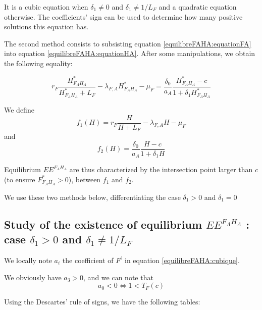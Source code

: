 \documentclass{article}
\newcommand{\lfa}{\lambda_{F, A}}
\begin{document}
\begin{appendices}
It is a cubic equation when $\delta_1 \neq 0$ and $\delta_1 \neq 1/L_F$ and a quadratic equation otherwise. 
The coefficients' sign can be used to determine how many positive solutions this equation has.


\medskip
The second method consists to subsisting equation \eqref{equilibreFAHA:equationFA} into equation \eqref{equilibreFAHA:equationHA}. After some manipulations, we obtain the following equality:

\begin{equation}
r_F \dfrac{H^*_{F_AH_A}}{H^*_{F_AH_A} + L_F} - \lfa H^*_{F_AH_A} - \mu_F = \dfrac{\delta_0}{a_A} \dfrac{H^*_{F_AH_A} - c}{1 + \delta_1 H^*_{F_AH_A}}
\label{equilibreFAHA:fonction}
\end{equation}

We define
\begin{equation*}
f_1(H) = r_F \dfrac{H}{H + L_F} - \lfa H - \mu_F
\end{equation*}
and 
\begin{equation*}
f_2(H) = \dfrac{\delta_0}{a_A} \dfrac{H - c}{1 + \delta_1 H}
\end{equation*}

Equilibrium $EE^{F_AH_A}$ are thus characterized by the intersection point larger than $c$ (to ensure $F^*_{F_AH_A} > 0$), between $f_1$ and $f_2$.

We use these two methods below, differentiating the case $\delta_1 > 0$ and $\delta_1 = 0$

\newpage
\subsection{Study of the existence of equilibrium $EE^{F_AH_A}$ : case $\delta_1 > 0$ and $\delta_1 \neq 1/L_F$}
We locally note $a_i$ the coefficient of $F^i$ in equation \eqref{equilibreFAHA:cubique}.

We obviously have $a_3 > 0$, and we can note that 
\begin{equation*}
a_0 < 0 \Leftrightarrow 1 < T_F(c)
\end{equation*}

Using the Descartes' rule of signs, we have the following tables:


\end{appendices}
\end{document}
